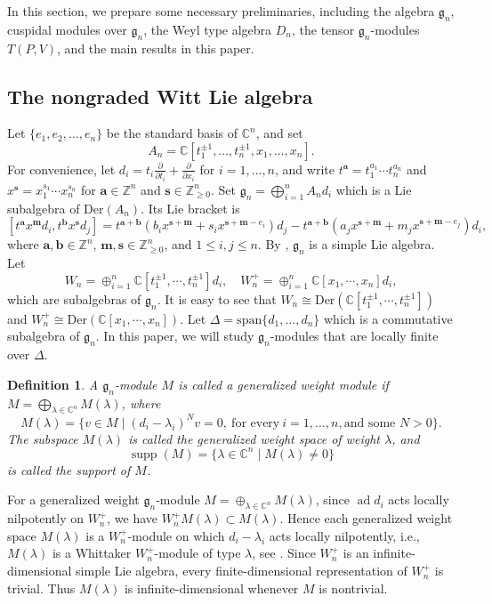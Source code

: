 \documentclass[12pt,a4paper]{amsart}
\def\mg{g}%
\numberwithin{equation}{section}
\newtheorem{definition}[theorem]{Definition}
\newcommand{\C}{\mathbb C}
\newcommand{\Z}{\mathbb{Z}}
\def\mg{\mathfrak{g}}
\def\ba{\mathbf{a}}
\def\bs{\mathbf{s}}
\def\bm{\mathbf{m}}
\def\bb{\mathbf{b}}
\begin{document}
In this section, we prepare some necessary preliminaries, including
the algebra $\mg_n$, cuspidal modules over $\mg_n$, the Weyl type algebra $D_n$, the tensor $\mg_n$-modules $T(P,V)$, and the main results in this paper.

\subsection{The nongraded Witt Lie algebra}

Let \(\{e_1,e_2,\ldots,e_n\}\) be the standard basis of \(\mathbb{C}^n\), and set
\[
A_n=\mathbb{C}[t_1^{\pm1},\ldots,t_n^{\pm1},
x_1,\ldots,x_n].
\]
For convenience, let \(d_i=t_i\frac{\partial}{\partial t_i}
+\frac{\partial}{\partial x_i}\) for \(i=1,\ldots,n\), and write
\(t^{\ba}=t_1^{a_1}\cdots t_n^{a_n}\) and
\(x^{\bs}=x_1^{s_1}\cdots x_n^{s_n}\) for
\(\ba\in\Z^n\) and \(\bs\in\Z_{\geq0}^n\).
Set \(\mg_n=\bigoplus_{i=1}^nA_nd_i\) which is a Lie subalgebra
of $\mathrm{Der}(A_n)$. Its Lie bracket is
$$[t^{\ba}x^{\bm}d_{i},t^{\bb}x^{\bs}d_{j}]=
t^{\ba+\bb}(b_ix^{\bs+\bm}+s_ix^{\bs+\bm-e_i})d_j
-t^{\ba+\bb}(a_jx^{\bs+\bm}+m_jx^{\bs+\bm-e_j})d_i,
$$
where \(\ba,\bb\in\Z^n\), \(\bm,\bs\in\Z_{\geq0}^n\), and
\(1\leq i,j\leq n\). By \cite[Theorem~2.2]{X2}, \(\mg_n\) is a simple Lie algebra.
Let
$$W_n=\oplus_{i=1}^n\mathbb{C}[t_1^{\pm 1},\cdots ,t_n^{\pm 1}]d_i, \quad W_n^+=\oplus_{i=1}^n\mathbb{C}[x_1,\cdots ,x_n]d_i,$$ which are subalgebras of $\mg_n$.
It is easy to see that  $W_n\cong\mathrm{Der}(\mathbb{C}[t_1^{\pm 1},\cdots ,t_n^{\pm 1}])$
and $W_n^+\cong\mathrm{Der}(\mathbb{C}[x_1,\cdots ,x_n])$.
Let $\Delta=\mathrm{span}\{d_1,\dots,d_n\}$ which is a commutative subalgebra of $\mg_n$. In this paper, we will study $\mg_n$-modules that are locally finite over $\Delta$.




\begin{definition}
A \(\mg_n\)-module \(M\) is called a generalized weight module if
\(M=\bigoplus_{\lambda\in\C^n}M(\lambda)\), where
$$M(\lambda)=\{v \in M \mid (d_i-\lambda_i)^N v=0,\  \text{for every}\ i=1,\dots,n,
\text{and some } N>0\}.$$
The subspace \(M(\lambda)\) is called the generalized weight space of
weight \(\lambda\), and
\[
\operatorname{supp}(M)=\{\lambda\in\C^n\mid M(\lambda)\neq0\}
\]
is called the support of \(M\).
\end{definition}

For a generalized weight $\mg_n$-module  $M=\oplus_{\lambda \in \C^{n} }M(\lambda)$,
since \(\operatorname{ad}d_i\) acts locally nilpotently on
$W_n^+$, we have $W_n^+M(\lambda)\subset M(\lambda)$. Hence
each generalized weight space
$M(\lambda)$ is a $W_n^+$-module on which
$d_i-\lambda_i$ acts locally nilpotently, i.e.,
$M(\lambda)$ is a Whittaker \(W_n^+\)-module of type \(\lambda\),
see \cite{ZL}. Since \(W_n^+\) is an infinite-dimensional simple Lie
algebra, every finite-dimensional representation of \(W_n^+\) is trivial.
Thus \(M(\lambda)\) is infinite-dimensional whenever \(M\) is nontrivial.
\end{document}
